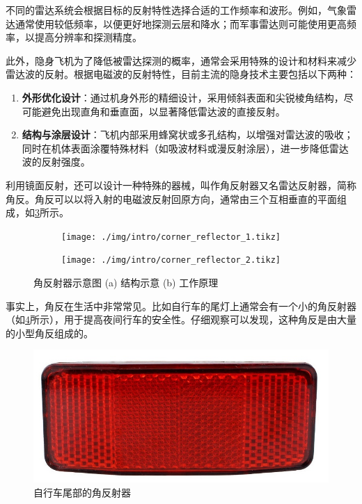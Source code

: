 不同的雷达系统会根据目标的反射特性选择合适的工作频率和波形。例如，气象雷达通常使用较低频率，以便更好地探测云层和降水；而军事雷达则可能使用更高频率，以提高分辨率和探测精度。

此外，隐身飞机为了降低被雷达探测的概率，通常会采用特殊的设计和材料来减少雷达波的反射。根据电磁波的反射特性，目前主流的隐身技术主要包括以下两种：
\begin{enumerate}
    \item \textbf{外形优化设计}：通过机身外形的精细设计，采用倾斜表面和尖锐棱角结构，尽可能避免出现直角和垂直面，以显著降低雷达波的直接反射。
    \item \textbf{结构与涂层设计}：飞机内部采用蜂窝状或多孔结构，以增强对雷达波的吸收；同时在机体表面涂覆特殊材料（如吸波材料或漫反射涂层），进一步降低雷达波的反射强度。
\end{enumerate}

利用镜面反射，还可以设计一种特殊的器械，叫作角反射器又名雷达反射器，简称角反。角反可以以将入射的电磁波反射回原方向，通常由三个互相垂直的平面组成，如\cref{fig_chp1_corner_reflector}所示。

\begin{figure}[htb!]
    \centering
    \begin{subfigure}{.3\textwidth}
        \centering
        \texttt{[image: ./img/intro/corner\_reflector\_1.tikz]}
        \caption{}
        \label{fig_chp1_corner_reflector_1}
    \end{subfigure}
    \begin{subfigure}{.3\textwidth}
        \centering
        \texttt{[image: ./img/intro/corner\_reflector\_2.tikz]}
        \caption{}
        \label{fig_chp1_corner_reflector_2}
    \end{subfigure}
    \caption{角反射器示意图 (a) 结构示意 (b) 工作原理}
    \label{fig_chp1_corner_reflector}
\end{figure}

事实上，角反在生活中非常常见。比如自行车的尾灯上通常会有一个小的角反射器（如\cref{fig_chp1_bike}所示），用于提高夜间行车的安全性。仔细观察可以发现，这种角反是由大量的小型角反组成的。

\begin{figure}[htb!]
    \centering
    \includegraphics[width=.4\textwidth]{./img/intro/bike.jpeg}
    \caption{自行车尾部的角反射器}
    \label{fig_chp1_bike}
\end{figure}

